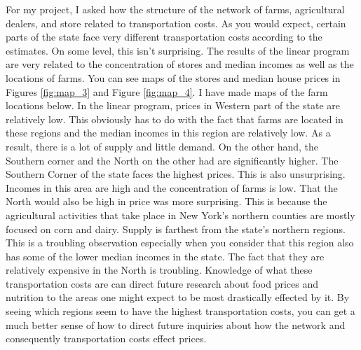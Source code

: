 \documentclass{report}
\begin{document}
For my project, I asked how the structure of the network of farms, agricultural dealers, and store related to transportation costs. As you would expect, certain parts of the state face very different transportation costs according to the estimates. On some level, this isn't surprising. The results of the linear program are very related to the concentration of stores and median incomes as well as the locations of farms. You can see maps of the stores and median house prices in Figures \ref{fig:map_3} and Figure \ref{fig:map_4}. I have made maps of the farm locations below. In the linear program, prices in Western part of the state are relatively low. This obviously has to do with the fact that farms are located in these regions and the median incomes in this region are relatively low. As a result, there is a lot of supply and little demand.  On the other hand, the Southern corner and the North on the other had are significantly higher. The Southern Corner of the state faces the highest prices. This is also unsurprising. Incomes in this area are high and the concentration of farms is low. That the North would also be high in price was more surprising. This is because the agricultural activities that take place in New York's northern counties are mostly focused on corn and dairy. Supply is farthest from the state's northern regions. This is a troubling observation especially when you consider that this region also has some of the lower median incomes in the state.  The fact that they are relatively expensive in the North is troubling. Knowledge of what these transportation costs are can direct future research about food prices and nutrition to the areas one might expect to be most drastically effected by it. By seeing which regions seem to have the highest transportation costs, you can get a much better sense of how to direct future inquiries about how the network and consequently transportation costs effect prices. 
\end{document}
